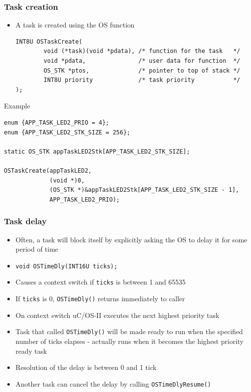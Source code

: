 \documentclass[hyperref={pdfpagelabels=false},svgnames]{beamer}
\begin{document}
\begin{frame}[fragile]
\frametitle{Task creation}
\lstset{basicstyle=\scriptsize, frame=single}
\begin{itemize}
\item A task is created using the OS function 

\begin{lstlisting}
INT8U OSTaskCreate(
        void (*task)(void *pdata), /* function for the task   */
        void *pdata,               /* user data for function  */
        OS_STK *ptos,              /* pointer to top of stack */
        INT8U priority             /* task priority           */
);
\end{lstlisting}

\end{itemize}

\pause

\begin{block}{Example}
\begin{lstlisting}
enum {APP_TASK_LED2_PRIO = 4};
enum {APP_TASK_LED2_STK_SIZE = 256};

static OS_STK appTaskLED2Stk[APP_TASK_LED2_STK_SIZE];

OSTaskCreate(appTaskLED2,                               
             (void *)0,
             (OS_STK *)&appTaskLED2Stk[APP_TASK_LED2_STK_SIZE - 1],
             APP_TASK_LED2_PRIO);
\end{lstlisting}

\end{block}
\end{frame}


\begin{frame}[fragile]
\frametitle{Task delay}
\begin{itemize}
\item Often, a task will block itself by explicitly asking the OS to delay it
for some period of time
\item \verb'void OSTimeDly(INT16U ticks);'
\item Causes a context switch if \verb'ticks' is between 1 and 65535
\item If \verb'ticks' is 0, \verb'OSTimeDly()' returns immediately to
  caller
\item On context switch uC/OS-II executes the next highest priority task
\item Task that called \verb'OSTimeDly()' will be made ready to run when
  the specified number of ticks elapses - actually runs when it becomes the
  highest priority ready task
\item Resolution of the delay is between 0 and 1 tick
\item Another task can cancel the delay by calling \verb'OSTimeDlyResume()'
\end{itemize}
\end{frame}
\end{document}
